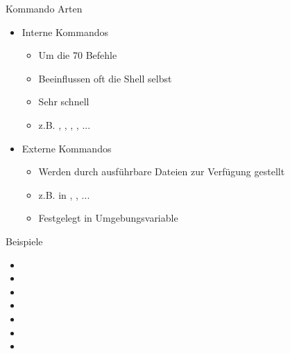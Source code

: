 \documentclass[aspectratio=43]{beamer}
\begin{document}
\begin{frame}

	\begin{block}{Kommando Arten} 
	\begin{itemize}
	\item Interne Kommandos
	\begin{itemize}
		\item Um die 70 Befehle
		\item Beeinflussen oft die Shell selbst
		\item Sehr schnell
		\item z.B. , , , , ... 
	\end{itemize}
	
	\item Externe Kommandos
	\begin{itemize}
		\item Werden durch ausführbare Dateien zur Verfügung gestellt
		\item z.B. in , , ...
		\item Festgelegt in Umgebungsvariable 
	\end{itemize}
	
	\end{itemize}
	\end{block}

\end{frame}

\begin{frame}
	
	\begin{exampleblock}{Beispiele} 
	\begin{itemize}
	\item  {}
	\item  {}
	\item  {}
	\item  {}
	\item  {}
	\item  {}
	\item  {}
	\end{itemize}
	\end{exampleblock}

\end{frame}
\end{document}
